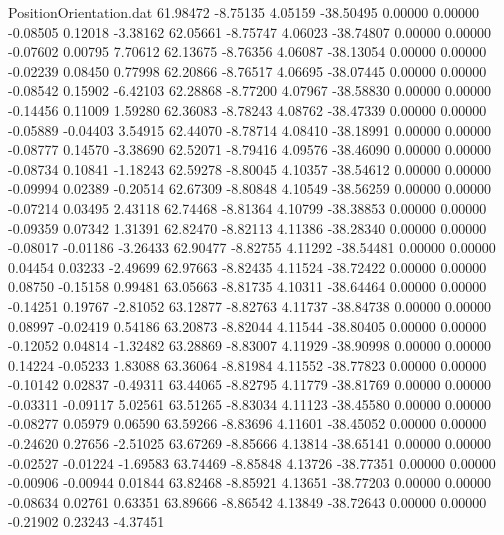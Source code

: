 \begin{filecontents}{PositionOrientation.dat}
  61.98472   -8.75135    4.05159   -38.50495    0.00000    0.00000   -0.08505    0.12018   -3.38162
  62.05661   -8.75747    4.06023   -38.74807    0.00000    0.00000   -0.07602    0.00795    7.70612
  62.13675   -8.76356    4.06087   -38.13054    0.00000    0.00000   -0.02239    0.08450    0.77998
  62.20866   -8.76517    4.06695   -38.07445    0.00000    0.00000   -0.08542    0.15902   -6.42103
  62.28868   -8.77200    4.07967   -38.58830    0.00000    0.00000   -0.14456    0.11009    1.59280
  62.36083   -8.78243    4.08762   -38.47339    0.00000    0.00000   -0.05889   -0.04403    3.54915
  62.44070   -8.78714    4.08410   -38.18991    0.00000    0.00000   -0.08777    0.14570   -3.38690
  62.52071   -8.79416    4.09576   -38.46090    0.00000    0.00000   -0.08734    0.10841   -1.18243
  62.59278   -8.80045    4.10357   -38.54612    0.00000    0.00000   -0.09994    0.02389   -0.20514
  62.67309   -8.80848    4.10549   -38.56259    0.00000    0.00000   -0.07214    0.03495    2.43118
  62.74468   -8.81364    4.10799   -38.38853    0.00000    0.00000   -0.09359    0.07342    1.31391
  62.82470   -8.82113    4.11386   -38.28340    0.00000    0.00000   -0.08017   -0.01186   -3.26433
  62.90477   -8.82755    4.11292   -38.54481    0.00000    0.00000    0.04454    0.03233   -2.49699
  62.97663   -8.82435    4.11524   -38.72422    0.00000    0.00000    0.08750   -0.15158    0.99481
  63.05663   -8.81735    4.10311   -38.64464    0.00000    0.00000   -0.14251    0.19767   -2.81052
  63.12877   -8.82763    4.11737   -38.84738    0.00000    0.00000    0.08997   -0.02419    0.54186
  63.20873   -8.82044    4.11544   -38.80405    0.00000    0.00000   -0.12052    0.04814   -1.32482
  63.28869   -8.83007    4.11929   -38.90998    0.00000    0.00000    0.14224   -0.05233    1.83088
  63.36064   -8.81984    4.11552   -38.77823    0.00000    0.00000   -0.10142    0.02837   -0.49311
  63.44065   -8.82795    4.11779   -38.81769    0.00000    0.00000   -0.03311   -0.09117    5.02561
  63.51265   -8.83034    4.11123   -38.45580    0.00000    0.00000   -0.08277    0.05979    0.06590
  63.59266   -8.83696    4.11601   -38.45052    0.00000    0.00000   -0.24620    0.27656   -2.51025
  63.67269   -8.85666    4.13814   -38.65141    0.00000    0.00000   -0.02527   -0.01224   -1.69583
  63.74469   -8.85848    4.13726   -38.77351    0.00000    0.00000   -0.00906   -0.00944    0.01844
  63.82468   -8.85921    4.13651   -38.77203    0.00000    0.00000   -0.08634    0.02761    0.63351
  63.89666   -8.86542    4.13849   -38.72643    0.00000    0.00000   -0.21902    0.23243   -4.37451

\end{filecontents}
